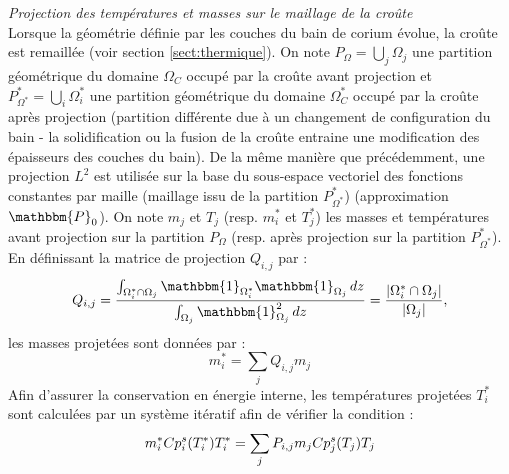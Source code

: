 {\it Projection des températures et masses sur le maillage de la croûte}\\
Lorsque la géométrie définie par les couches du bain de corium évolue, la croûte est remaillée (voir section \ref{sect:thermique}). On note $P_{\Omega}=\displaystyle{\bigcup_j} \Omega_j$ une partition géométrique du domaine $\Omega_C$ occupé par la croûte avant projection et $P_{\Omega^*}^*=\displaystyle{\bigcup_i} \Omega_i^*$ une partition géométrique du domaine $\Omega_C^*$ occupé par la croûte après projection (partition différente due à un changement de configuration du bain - la solidification ou la fusion de la croûte entraine une modification des épaisseurs des couches du bain). De la même manière que précédemment, une projection $L^2$ est utilisée sur la base du sous-espace vectoriel des fonctions constantes par maille (maillage issu de la partition $P_{\Omega^*}^*$) (approximation $\mathbbm{P}_0$).
On note $m_j$ et $T_j$ (resp. $m_i^*$ et $T_j^*$) les masses et températures avant projection sur la partition $P_{\Omega}$ (resp. après projection sur la partition $P_{\Omega^*}^*$). En définissant la matrice de projection $Q_{i,j}$ par :
$$Q_{i,j}=\frac{\int_{\Omega_i^*\cap\Omega_j}{\mathbbm{1}}_{\Omega_i^*}{\mathbbm{1}}_{\Omega_j}\, dz}{ \int_{\Omega_j}{\mathbbm{1}}_{\Omega_j}^2\, dz}=\frac{\vert \Omega_i^*\cap\Omega_j \vert}{\vert \Omega_j \vert},$$ les masses projetées sont données par :
$$m_i^*=\sum_j Q_{i,j} m_j$$
Afin d'assurer la conservation en énergie interne, les températures projetées $T_i^*$ sont calculées par un système itératif afin de vérifier la condition :
$$m_i^* \heatCp[s]{i}(T_i^*) T_i^* = \sum_j P_{i,j} m_j \heatCp[s]{j} (T_j) T_j$$
